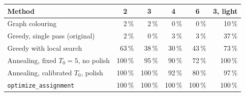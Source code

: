 \begin{tabular}{lrrrrr}
\toprule
Method & \multicolumn{1}{c}{2} & \multicolumn{1}{c}{3} & \multicolumn{1}{c}{4} & \multicolumn{1}{c}{6} & \multicolumn{1}{c}{3, light} \\
\midrule
Graph colouring & 2\,\% & 2\,\% & 0\,\% & 0\,\% & 10\,\% \\
Greedy, single pass (original) & 2\,\% & 0\,\% & 3\,\% & 3\,\% & 37\,\% \\
Greedy with local search & 63\,\% & 38\,\% & 30\,\% & 43\,\% & 73\,\% \\
Annealing, fixed $T_0 = 5$, no polish & 100\,\% & 95\,\% & 90\,\% & 72\,\% & 100\,\% \\
Annealing, calibrated $T_0$, polish & 100\,\% & 100\,\% & 92\,\% & 80\,\% & 97\,\% \\
\texttt{optimize\_assignment} & 100\,\% & 100\,\% & 100\,\% & 100\,\% & 100\,\% \\
\bottomrule
\end{tabular}
